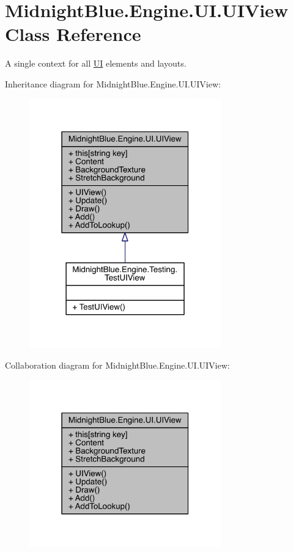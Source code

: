 \hypertarget{class_midnight_blue_1_1_engine_1_1_u_i_1_1_u_i_view}{}\section{Midnight\+Blue.\+Engine.\+U\+I.\+U\+I\+View Class Reference}
\label{class_midnight_blue_1_1_engine_1_1_u_i_1_1_u_i_view}


A single context for all \hyperlink{namespace_midnight_blue_1_1_engine_1_1_u_i}{UI} elements and layouts.  




Inheritance diagram for Midnight\+Blue.\+Engine.\+U\+I.\+U\+I\+View\+:
\nopagebreak
\begin{figure}[H]
\begin{center}
\leavevmode
\includegraphics[width=235pt]{class_midnight_blue_1_1_engine_1_1_u_i_1_1_u_i_view__inherit__graph}
\end{center}
\end{figure}


Collaboration diagram for Midnight\+Blue.\+Engine.\+U\+I.\+U\+I\+View\+:
\nopagebreak
\begin{figure}[H]
\begin{center}
\leavevmode
\includegraphics[width=235pt]{class_midnight_blue_1_1_engine_1_1_u_i_1_1_u_i_view__coll__graph}
\end{center}
\end{figure}
